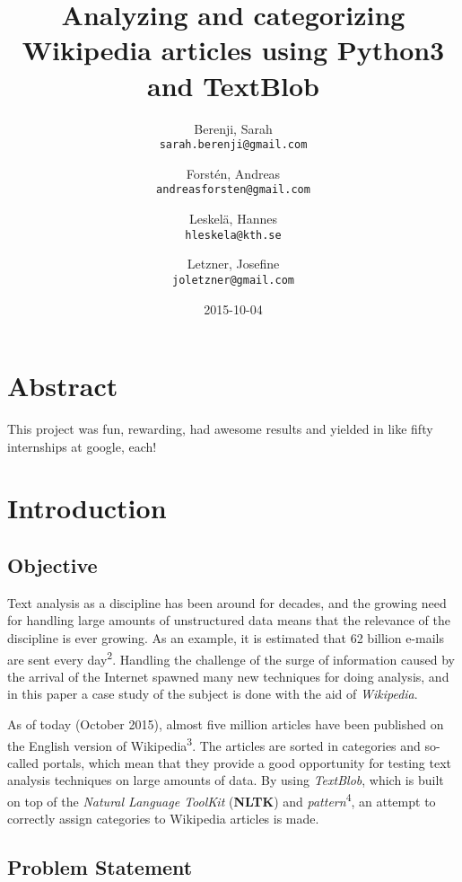 \documentclass[a4paper]{article}
\title{Analyzing and categorizing Wikipedia articles using Python3 and TextBlob}
\author{
  Berenji, Sarah\\
  \texttt{sarah.berenji@gmail.com}
  \and
  Forstén, Andreas\\
  \texttt{andreasforsten@gmail.com}
  \and
  Leskelä, Hannes\\
  \texttt{hleskela@kth.se}
  \and
  Letzner, Josefine\\
    \texttt{joletzner@gmail.com}
}
\date{2015-10-04}
\begin{document}
\maketitle
\section*{Abstract}
This project was fun, rewarding, had awesome results and yielded in like fifty internships at google, each!
\newpage
\tableofcontents
\newpage

\section*{Introduction}


\vspace{3mm}

\subsection*{Objective}

Text analysis as a discipline has been around for decades, and the growing need for handling large amounts of unstructured data means that the relevance of the discipline is ever growing. As an example, it is estimated that 62 billion e-mails are sent every day\textsuperscript{2}.  Handling the challenge of the surge of information caused by the arrival of the Internet spawned many new techniques for doing analysis, and in this paper a case study of the subject is done with the aid of \textit{Wikipedia}. 

\vspace{3mm}

As of today (October 2015), almost five million articles have been published on the English version of Wikipedia\textsuperscript{3}. The articles are sorted in categories and so-called portals, which mean that they provide a good opportunity for testing text analysis techniques on large amounts of data. By using \textit{TextBlob}, which is built on top of the \textit{Natural Language ToolKit} (\textbf{NLTK}) and \textit{pattern}\textsuperscript{4}, an attempt to correctly assign categories to Wikipedia articles is made. 

\vspace{3mm}

\subsection*{Problem Statement}
\end{document}
